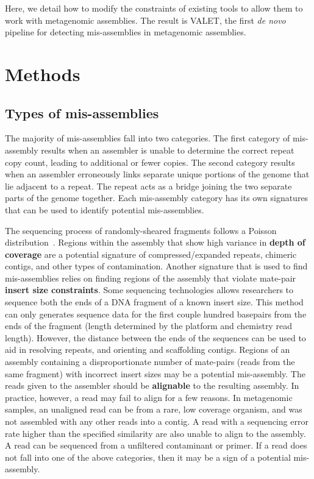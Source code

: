 \documentclass{bioinfo}
\begin{document}
Here, we detail how to modify the constraints of existing tools to allow them to work with metagenomic assemblies.
The result is VALET, the first \emph{de novo} pipeline for detecting mis-assemblies in metagenomic assemblies.

\section{Methods}

\subsection{Types of mis-assemblies}

The majority of mis-assemblies fall into two categories. 
The first category of mis-assembly results when an assembler is unable to determine the correct repeat copy count, leading to additional or fewer copies.
The second category results when an assembler erroneously links separate unique portions of the genome that lie adjacent to a repeat.
The repeat acts as a bridge joining the two separate parts of the genome together.
Each mis-assembly category has its own signatures that can be used to identify potential mis-assemblies.

The sequencing process of randomly-sheared fragments follows a Poisson distribution~\citep{lander1988genomic}.
Regions within the assembly that show high variance in \textbf{depth of coverage} are a potential signature of compressed/expanded repeats, chimeric contigs, and other types of contamination. 
Another signature that is used to find mis-assemblies relies on finding regions of the assembly that violate mate-pair \textbf{insert size constraints}.
Some sequencing technologies allows researchers to sequence both the ends of a DNA fragment of a known insert size.
This method can only generates sequence data for the first couple hundred basepairs from the ends of the fragment (length determined by the platform and chemistry read length). 
However, the distance between the ends of the sequences can be used to aid in resolving repeats, and orienting and scaffolding contigs.
Regions of an assembly containing a disproportionate number of mate-pairs (reads from the same fragment) with incorrect insert sizes may be a potential mis-assembly. 
The reads given to the assembler should be \textbf{alignable} to the resulting assembly.
In practice, however, a read may fail to align for a few reasons.
In metagenomic samples, an unaligned read can be from a rare, low coverage organism, and was not assembled with any other reads into a contig.
A read with a sequencing error rate higher than the specified similarity are also unable to align to the assembly.
A read can be sequenced from a unfiltered contaminant or primer.
If a read does not fall into one of the above categories, then it may be a sign of a potential mis-assembly.
\end{document}
